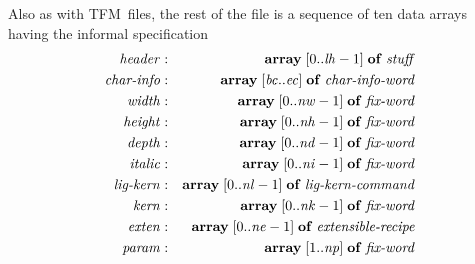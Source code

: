 \documentclass[fleqn]{article}
\newcommand{\myit}[1]{\mbox{\emph{#1}}}
\newcommand{\TFM}{TFM}
\begin{document}
Also as with \TFM\ files, the rest of the file is a sequence of ten data arrays having the informal specification
\begin{eqnarray*}
\myit{header} & : &
     \mathbf{array}\;[0..\myit{lh}-1]\;\mathbf{of}\;\myit{stuff}\\
\myit{char-info} & : &
     \mathbf{array}\;[\myit{bc}..\myit{ec}]\;\mathbf{of}\;
     \myit{char-info-word}\\
\myit{width} & : &
     \mathbf{array}\;[0..\myit{nw}-1]\;\mathbf{of}\;\myit{fix-word}\\
\myit{height} & : &
     \mathbf{array}\;[0..\myit{nh}-1]\;\mathbf{of}\;\myit{fix-word}\\
\myit{depth} & : &
     \mathbf{array}\;[0..\myit{nd}-1]\;\mathbf{of}\;\myit{fix-word}\\
\myit{italic} & : &
     \mathbf{array}\;[0..\myit{ni}-1]\;\mathbf{of}\;\myit{fix-word}\\
\myit{lig-kern} & : &
     \mathbf{array}\;[0..\myit{nl}-1]\;\mathbf{of}\;
     \myit{lig-kern-command}\\
\myit{kern} & : &
     \mathbf{array}\;[0..\myit{nk}-1]\;\mathbf{of}\;\myit{fix-word}\\
\myit{exten} & : &
     \mathbf{array}\;[0..\myit{ne}-1]\;\mathbf{of}\;
     \myit{extensible-recipe}\\
\myit{param} & : &
     \mathbf{array}\;[1..\myit{np}]\;\mathbf{of}\;\myit{fix-word}
\end{eqnarray*}
\end{document}
